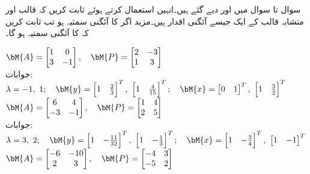 سوال  تا سوال  میں  اور  دیے گئے ہیں۔انہیں استعمال کرتے ہوئے ثابت کریں کہ قالب  اور متشابہ قالب  کے ایک جیسے آئگنی اقدار ہیں۔مزید اگر  کا آئگنی سمتیہ  ہو تب ثابت کریں کہ  کا آئگنی سمتیہ  ہو گا۔

\quad
$\bM{A}=\begin{bmatrix} 1&0\\3&-1 \end{bmatrix},\quad \bM{P}=\begin{bmatrix} 2&-3\\1&3 \end{bmatrix}$\\
جوابات:
$\lambda=-1,\,\, 1;\quad \bM{y}=\begin{bmatrix} 1&\tfrac{2}{3} \end{bmatrix}^T,\,\,\begin{bmatrix} 1&\tfrac{4}{15} \end{bmatrix}^T; \quad 
\bM{x}=\begin{bmatrix} 0&1 \end{bmatrix}^T,\,\, \begin{bmatrix} 1&\tfrac{3}{2} \end{bmatrix}^T$
\quad
$\bM{A}=\begin{bmatrix} 6&4\\-3&-1 \end{bmatrix},\quad \bM{P}=\begin{bmatrix} 1&4\\2&5 \end{bmatrix}$\\
جوابات:
$\lambda=3,\,\,2;\quad \bM{y}=\begin{bmatrix} 1&-\tfrac{11}{32} \end{bmatrix}^T,\,\,\begin{bmatrix} 1&-\tfrac{1}{3} \end{bmatrix}^T; \quad 
\bM{x}=\begin{bmatrix} 1&-\tfrac{3}{4} \end{bmatrix}^T,\,\, \begin{bmatrix} 1&-1 \end{bmatrix}^T$
\quad
$\bM{A}=\begin{bmatrix} -6&-10\\2&3 \end{bmatrix},\quad \bM{P}=\begin{bmatrix} -4&3\\-5&2 \end{bmatrix}$\\
